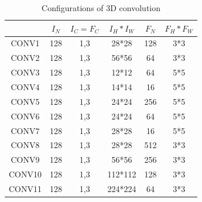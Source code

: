 \documentclass[sigplan,review,anonymous]{acmart}\settopmatter{printfolios=true,printccs=false,printacmref=false}
\begin{document}
\begin{table}[]
\caption{Configurations of 3D convolution}
\label{tab:3dconvconfigs}
\begin{tabular}{c|ccccc}
\hline
& $I_N$ & $I_C=F_C$ & $I_H*I_W$ & $F_N$ & $F_H*F_W$ \\
\hline
CONV1 & 128  & 1,3       & 28*28     & 128  & 3*3       \\
CONV2 & 128  & 1,3       & 56*56     & 64   & 3*3       \\
CONV3 & 128  & 1,3       & 12*12     & 64   & 5*5       \\
CONV4 & 128  & 1,3       & 14*14     & 16   & 5*5       \\
CONV5 & 128  & 1,3       & 24*24    & 256  & 5*5       \\
CONV6 & 128  & 1,3       & 24*24     & 64   & 5*5       \\
CONV7 & 128  & 1,3       & 28*28     & 16   & 5*5       \\
CONV8 & 128  & 1,3       & 28*28     & 512   & 3*3       \\
CONV9 & 128  & 1,3       & 56*56     & 256  & 3*3       \\
CONV10 & 128  & 1,3       & 112*112     & 128   & 3*3       \\
CONV11 & 128  & 1,3       & 224*224     & 64   & 3*3      \\
\hline
\end{tabular}
\end{table}
\end{document}
